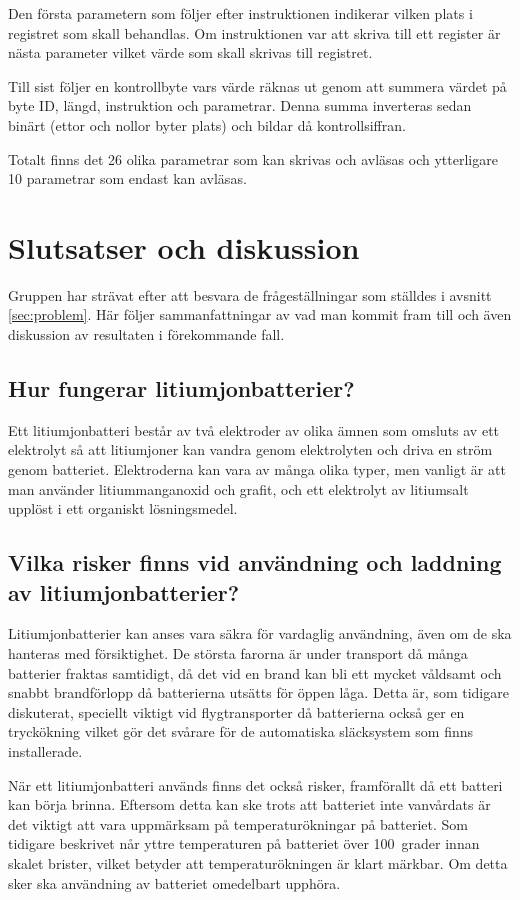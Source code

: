 \documentclass[a4paper,12pt]{article}
\begin{document}
Den första parametern som följer efter instruktionen indikerar vilken plats i registret som skall behandlas. Om instruktionen var att skriva till ett register är nästa parameter vilket värde som skall skrivas till registret. 

Till sist följer en kontrollbyte vars värde räknas ut genom att summera värdet på byte ID, längd, instruktion och parametrar. Denna summa inverteras sedan binärt (ettor och nollor byter plats) och bildar då kontrollsiffran.

Totalt finns det 26 olika parametrar som kan skrivas och avläsas och ytterligare 10 parametrar som endast kan avläsas. \cite{dyn-manual}
 \newpage
\section{Slutsatser och diskussion}
Gruppen har strävat efter att besvara de frågeställningar som ställdes i avsnitt \ref{sec:problem}. Här följer sammanfattningar av vad man kommit fram till och även diskussion av resultaten i förekommande fall.

\subsection{Hur fungerar litiumjonbatterier?}
Ett litiumjonbatteri består av två elektroder av olika ämnen som omsluts av ett elektrolyt så att litiumjoner kan vandra genom elektrolyten och driva en ström genom batteriet. Elektroderna kan vara av många olika typer, men vanligt är att man använder litiummanganoxid och grafit, och ett elektrolyt av litiumsalt upplöst i ett organiskt lösningsmedel.\cite{litium-in-cars}

\subsection{Vilka risker finns vid användning och laddning av litiumjonbatterier?}
Litiumjonbatterier kan anses vara säkra för vardaglig användning, även om de ska hanteras med försiktighet. De största farorna är under transport då många batterier fraktas samtidigt, då det vid en brand kan bli ett mycket våldsamt och snabbt brandförlopp då batterierna utsätts för öppen låga. Detta är, som tidigare diskuterat, speciellt viktigt vid flygtransporter då batterierna också ger en tryckökning vilket gör det svårare för de automatiska släcksystem som finns installerade.

När ett litiumjonbatteri används finns det också risker, framförallt då ett batteri kan börja brinna. Eftersom detta kan ske trots att batteriet inte vanvårdats är det viktigt att vara uppmärksam på temperaturökningar på batteriet. Som tidigare beskrivet når yttre temperaturen på batteriet över 100~grader innan skalet brister, vilket betyder att temperaturökningen är klart märkbar. Om detta sker ska användning av batteriet omedelbart upphöra.
\end{document}
